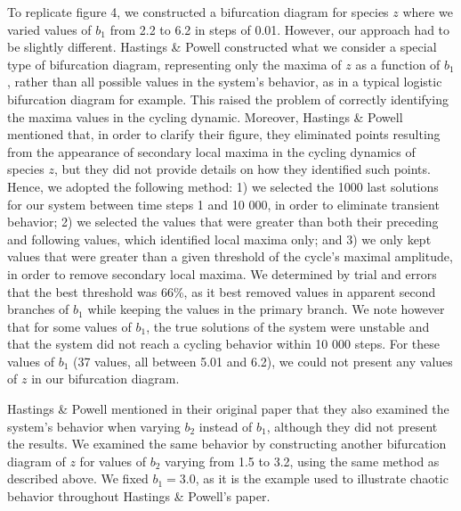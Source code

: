 \documentclass[
]{article}
\begin{document}
To replicate figure 4, we constructed a bifurcation diagram for species
\(z\) where we varied values of \(b_1\) from 2.2 to 6.2 in steps of
0.01. However, our approach had to be slightly different. Hastings \&
Powell constructed what we consider a special type of bifurcation
diagram, representing only the maxima of \(z\) as a function of \(b_1\),
rather than all possible values in the system's behavior, as in a
typical logistic bifurcation diagram for example. This raised the
problem of correctly identifying the maxima values in the cycling
dynamic. Moreover, Hastings \& Powell mentioned that, in order to
clarify their figure, they eliminated points resulting from the
appearance of secondary local maxima in the cycling dynamics of species
\(z\), but they did not provide details on how they identified such
points. Hence, we adopted the following method: 1) we selected the 1000
last solutions for our system between time steps 1 and 10 000, in order
to eliminate transient behavior; 2) we selected the values that were
greater than both their preceding and following values, which identified
local maxima only; and 3) we only kept values that were greater than a
given threshold of the cycle's maximal amplitude, in order to remove
secondary local maxima. We determined by trial and errors that the best
threshold was 66\%, as it best removed values in apparent second
branches of \(b_1\) while keeping the values in the primary branch. We
note however that for some values of \(b_1\), the true solutions of the
system were unstable and that the system did not reach a cycling
behavior within 10 000 steps. For these values of \(b_1\) (37 values,
all between 5.01 and 6.2), we could not present any values of \(z\) in
our bifurcation diagram.

Hastings \& Powell mentioned in their original paper that they also
examined the system's behavior when varying \(b_2\) instead of \(b_1\),
although they did not present the results. We examined the same behavior
by constructing another bifurcation diagram of \(z\) for values of
\(b_2\) varying from 1.5 to 3.2, using the same method as described
above. We fixed \(b_1 = 3.0\), as it is the example used to illustrate
chaotic behavior throughout Hastings \& Powell's paper.
\end{document}
